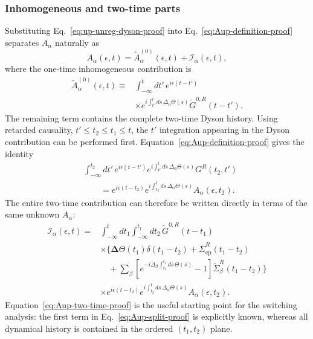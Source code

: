 \documentclass[
 reprint,
 superscriptaddress,
 amsmath,amssymb,
 aps,prb,
 longbibliography,
 floatfix
]{revtex4-2}
\newcommand{\ep}{\mathrm{ep}}
\newcommand{\barSigma}{\overline{\Sigma}}
\begin{document}
\subsubsection{Inhomogeneous and two-time parts}
Substituting Eq.~\eqref{eq:up-unreg-dyson-proof} into Eq.~\eqref{eq:Aup-definition-proof} separates $A_\alpha$ naturally as
\begin{equation}
A_\alpha(\epsilon,t)
=
\widetilde A_\alpha^{(0)}(\epsilon,t)
+
\mathcal I_\alpha(\epsilon,t),
\label{eq:Aup-split-proof}
\end{equation}
where the one-time inhomogeneous contribution is
\begin{equation}
\begin{aligned}
\widetilde A_\alpha^{(0)}(\epsilon,t)
\equiv{}&
\int_{-\infty}^{t}dt'\,
e^{i\epsilon(t-t')}
\\
&\times
e^{i\int_{t'}^t ds\,\Delta_\alpha\Theta(s)}
\widetilde G^{0,R}(t-t').
\end{aligned}
\label{eq:Atilde-up-proof-def}
\end{equation}
The remaining term contains the complete two-time Dyson history. Using retarded causality, $t'\le t_2\le t_1\le t$, the $t'$ integration appearing in the Dyson contribution can be performed first. Equation~\eqref{eq:Aup-definition-proof} gives the identity
\begin{equation*}
\begin{aligned}
&\int_{-\infty}^{t_2}dt'\,
e^{i\epsilon(t-t')}
e^{i\int_{t'}^t ds\,\Delta_\alpha\Theta(s)}
G^R(t_2,t')
\\
&\qquad=
e^{i\epsilon(t-t_2)}
e^{i\int_{t_2}^t ds\,\Delta_\alpha\Theta(s)}
A_\alpha(\epsilon,t_2).
\end{aligned}
\end{equation*}
The entire two-time contribution can therefore be written directly in terms of the same unknown $A_\alpha$:
\begin{equation}
\begin{aligned}
\mathcal I_\alpha(\epsilon,t)
={}&
\int_{-\infty}^{t}dt_1
\int_{-\infty}^{t_1}dt_2\,
\widetilde G^{0,R}(t-t_1)
\\
&\times
\Bigg\{
\bm\Delta\Theta(t_1)\delta(t_1-t_2) +
\barSigma_{\ep}^R(t_1-t_2)
\\
&\quad+
\sum_\beta
\left[
e^{-i\Delta_\beta
\int_{t_2}^{t_1}ds\,\Theta(s)}
-1
\right]
\widetilde\Sigma_\beta^R(t_1-t_2)
\Bigg\}
\\
&\times
e^{i\epsilon(t-t_2)}
e^{i\int_{t_2}^t ds\,\Delta_\alpha\Theta(s)}
A_\alpha(\epsilon,t_2).
\end{aligned}
\label{eq:Aup-two-time-proof}
\end{equation}
Equation~\eqref{eq:Aup-two-time-proof} is the useful starting point for the switching analysis: the first term in Eq.~\eqref{eq:Aup-split-proof} is explicitly known, whereas all dynamical history is contained in the ordered $(t_1,t_2)$ plane.
\end{document}
